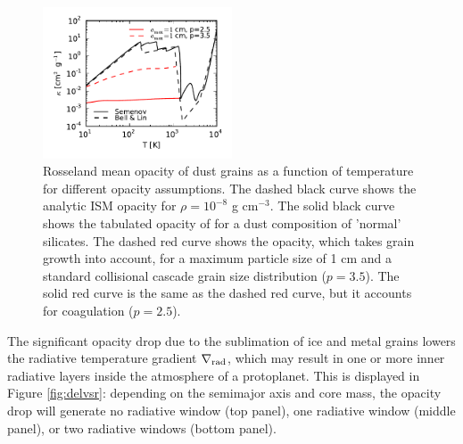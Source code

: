 \begin{figure}[h!]
\centering
\includegraphics[width=0.5\textwidth]{figures/kappa_grain_growth_SBL_paper.pdf}
\caption{Rosseland mean opacity of dust grains as a function of temperature for different opacity assumptions. The dashed black curve shows the \citet{bell94} analytic ISM opacity for $\rho=10^{-8}$ g cm$^{-3}$. The solid black curve shows the tabulated opacity of \citet{semenov03} for a dust composition of 'normal' silicates. The dashed red curve shows the \citet{dalessio01} opacity, which takes grain growth into account, for a maximum particle size of 1 cm and a standard collisional cascade grain size distribution ($p=3.5$). The solid red curve is the same as the dashed red curve, but it accounts for coagulation ($p=2.5$).}
\label{fig:opacity}
\end{figure}

The significant opacity drop due to the sublimation of ice and metal grains lowers the radiative temperature gradient $\nabla_{\rm rad}$, which may result in one or more inner radiative layers inside the atmosphere of a protoplanet. This is displayed in Figure \ref{fig:delvsr}: depending on the semimajor axis and core mass, the opacity drop will generate no radiative window (top panel), one radiative window (middle panel), or two radiative windows (bottom panel). 

